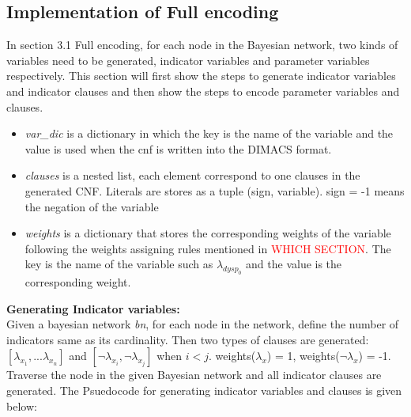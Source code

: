 \subsection{Implementation of Full encoding}
    In section 3.1 Full encoding, for each node in the Bayesian network, two kinds of variables need to be generated, indicator variables and parameter variables respectively. This section will first show the steps to generate indicator variables and indicator clauses and then show the steps to encode parameter variables and clauses.
    \begin{itemize}
        \item \textit{var\_dic} is a dictionary in which the key is the name of the variable and the value is used when the cnf is written into the DIMACS format. 
        \item \textit{clauses} is a nested list, each element correspond to one clauses in the generated CNF. Literals are stores as a tuple (sign, variable). sign = -1 means the negation of the variable
        \item \textit{weights} is a dictionary that stores the corresponding weights of the variable following the weights assigning rules mentioned in \textcolor{red}{WHICH SECTION}. The key is the name of the variable such as $\lambda_{dysp_{0}}$ and the value is the corresponding weight.
    \end{itemize}
    \textbf{Generating Indicator variables:}\\
    Given a bayesian network \textit{bn}, for each node in the network, define the number of indicators same as its cardinality. Then two types of clauses are generated: $[\lambda_{x_{1}}, ... \lambda_{x_{n}}]$ and $[\neg \lambda_{x_{i}}, \neg \lambda_{x_{j}}]$ when $i < j$. weights($\lambda_{x}$) = 1, weights($\neg \lambda_{x}$) = -1. Traverse the node in the given Bayesian network and all indicator clauses are generated.
    The Psuedocode for generating indicator variables and clauses is given below:

